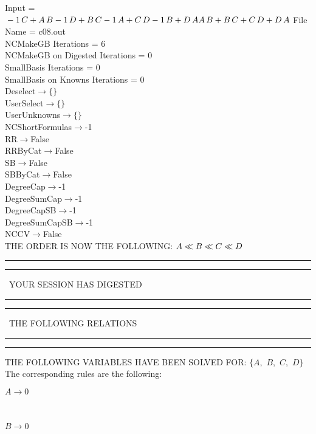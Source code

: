 \documentclass[rep10,leqno]{report}
\begin{document}
\normalsize
\baselineskip=12pt
\noindent
Input = 
$
\\-1\,
 C + A\,
 B\\
-1\,
 D + B\,
 C\\
-1\,
 A + C\,
 D\\
-1\,
 B + D\,
 A\\
A\,
 B + B\,
 C + C\,
 D + D\,
 A\\
$
File Name = c08.out\\
NCMakeGB Iterations = 6\\
NCMakeGB on Digested Iterations = 0\\
SmallBasis Iterations = 0\\
SmallBasis on Knowns Iterations = 0\\
Deselect$\rightarrow \{\}$\\
UserSelect$\rightarrow \{\}$\\
UserUnknowns$\rightarrow \{\}$\\
NCShortFormulas$\rightarrow$-1\\
RR$\rightarrow $False\\
RRByCat$\rightarrow $False\\
SB$\rightarrow $False\\
SBByCat$\rightarrow $False\\
DegreeCap$\rightarrow $-1\\
DegreeSumCap$\rightarrow $-1\\
DegreeCapSB$\rightarrow $-1\\
DegreeSumCapSB$\rightarrow $-1\\
NCCV$\rightarrow $False\\
THE ORDER IS NOW THE FOLLOWING:\hfil\break
$
A\ll
B\ll
C\ll
D\\
$
\rule[2pt]{6in}{4pt}\hfil\break
\rule[2pt]{1.879in}{4pt}
\ YOUR SESSION HAS DIGESTED\ 
\rule[2pt]{1.879in}{4pt}\hfil\break
\rule[2pt]{1.923in}{4pt}
\ THE FOLLOWING RELATIONS\ 
\rule[2pt]{1.923in}{4pt}\hfil\break
\rule[2pt]{6in}{4pt}\hfil\break
THE FOLLOWING VARIABLES HAVE BEEN SOLVED FOR:\hfil\break
$\{A,
$ $
B,
$ $
C,
$ $
D\}$
\smallskip\\
The corresponding rules are the following:\smallskip\\
\begin{minipage}{6in}
$
A\rightarrow 0
$
\end{minipage}\medskip\\
\begin{minipage}{6in}
$
B\rightarrow 0
$
\end{minipage}\medskip\\
\end{document}
